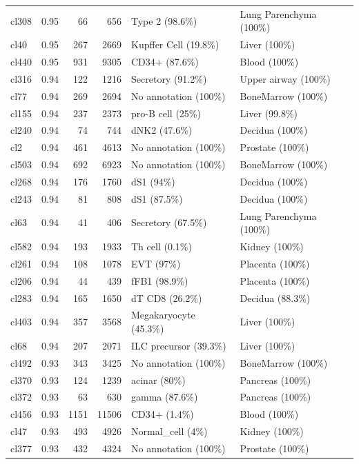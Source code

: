 \begin{table}[ht!]
\begin{tabular}{lrrrll}
  cl308 & 0.95 &  66 & 656 & Type 2 (98.6\%) & Lung Parenchyma (100\%) \\ 
  cl40 & 0.95 & 267 & 2669 & Kupffer Cell (19.8\%) & Liver (100\%) \\ 
  cl440 & 0.95 & 931 & 9305 & CD34+ (87.6\%) & Blood (100\%) \\ 
  cl316 & 0.94 & 122 & 1216 & Secretory (91.2\%) & Upper airway (100\%) \\ 
  cl77 & 0.94 & 269 & 2694 & No annotation (100\%) & BoneMarrow (100\%) \\ 
  cl155 & 0.94 & 237 & 2373 & pro-B cell (25\%) & Liver (99.8\%) \\ 
  cl240 & 0.94 &  74 & 744 & dNK2 (47.6\%) & Decidua (100\%) \\ 
  cl2 & 0.94 & 461 & 4613 & No annotation (100\%) & Prostate (100\%) \\ 
  cl503 & 0.94 & 692 & 6923 & No annotation (100\%) & BoneMarrow (100\%) \\ 
  cl268 & 0.94 & 176 & 1760 & dS1 (94\%) & Decidua (100\%) \\ 
  cl243 & 0.94 &  81 & 808 & dS1 (87.5\%) & Decidua (100\%) \\ 
  cl63 & 0.94 &  41 & 406 & Secretory (67.5\%) & Lung Parenchyma (100\%) \\ 
  cl582 & 0.94 & 193 & 1933 & Th cell (0.1\%) & Kidney (100\%) \\ 
  cl261 & 0.94 & 108 & 1078 & EVT (97\%) & Placenta (100\%) \\ 
  cl206 & 0.94 &  44 & 439 & fFB1 (98.9\%) & Placenta (100\%) \\ 
  cl283 & 0.94 & 165 & 1650 & dT CD8 (26.2\%) & Decidua (88.3\%) \\ 
  cl403 & 0.94 & 357 & 3568 & Megakaryocyte (45.3\%) & Liver (100\%) \\ 
  cl68 & 0.94 & 207 & 2071 & ILC precursor (39.3\%) & Liver (100\%) \\ 
  cl492 & 0.93 & 343 & 3425 & No annotation (100\%) & BoneMarrow (100\%) \\ 
  cl370 & 0.93 & 124 & 1239 & acinar (80\%) & Pancreas (100\%) \\ 
  cl372 & 0.93 &  63 & 630 & gamma (87.6\%) & Pancreas (100\%) \\ 
  cl456 & 0.93 & 1151 & 11506 & CD34+ (1.4\%) & Blood (100\%) \\ 
  cl47 & 0.93 & 493 & 4926 & Normal\_cell (4\%) & Kidney (100\%) \\ 
  cl377 & 0.93 & 432 & 4324 & No annotation (100\%) & Prostate (100\%) \\ 

\end{tabular}
\end{table}
